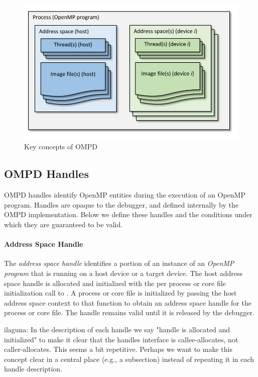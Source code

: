 \begin{figure}
  \centering
    \includegraphics[width=6.0in,natwidth=396,natheight=252]{figures/ompd-concepts.pdf}
  \caption{Key concepts of OMPD}
\label{ompd-concepts:fig}
\end{figure}

\subsection{OMPD Handles}
OMPD handles identify OpenMP entities during the
execution of an OpenMP program.
Handles are opaque to the debugger, and defined internally
by the OMPD implementation.
Below we define these handles and the conditions under which they
are guaranteed to be valid.

\paragraph{Address Space Handle}
The \emph{address space handle} identifies a portion of an instance of
an \emph{OpenMP program} that is running on a host device or a target
device.
The host address space handle is allocated and initialized with the per 
process or core file initialization 
call to . 
A process or core file is initialized by passing the host address
space context to that function to obtain an address space handle for
the process or core file.
The handle remains valid until it is released by the debugger.

\begin{notes}
ilaguna: In the description of each handle we say "handle is allocated and 
initialized" to make it clear that the handles interface is callee-allocates, 
not caller-allocates. This seems a bit repetitive. Perhaps we want to make this 
concept clear in a central place (e.g., a subsection) instead of repeating it 
in each handle description.
\end{notes}

